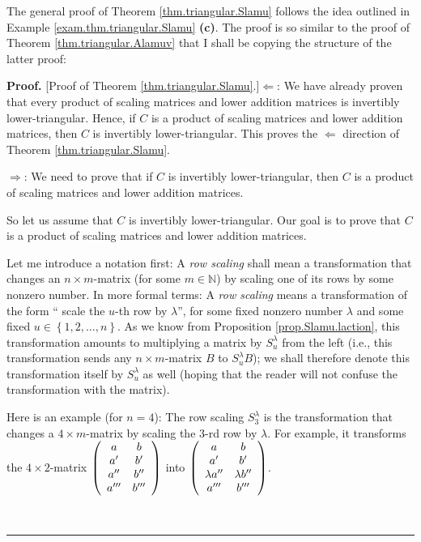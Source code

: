 \documentclass[numbers=enddot,12pt,final,onecolumn,notitlepage]{scrartcl}%
\theoremstyle{definition}
\newenvironment{proof}[1][Proof]{\noindent\textbf{#1.} }{\ \rule{0.5em}{0.5em}}
\begin{document}
The general proof of Theorem \ref{thm.triangular.Slamu} follows the idea
outlined in Example \ref{exam.thm.triangular.Slamu} \textbf{(c)}. The proof is
so similar to the proof of Theorem \ref{thm.triangular.Alamuv} that I shall be
copying the structure of the latter proof:

\begin{proof}
[Proof of Theorem \ref{thm.triangular.Slamu}.]$\Longleftarrow$: We have
already proven that every product of scaling matrices and lower addition
matrices is invertibly lower-triangular. Hence, if $C$ is a product of scaling
matrices and lower addition matrices, then $C$ is invertibly lower-triangular.
This proves the $\Longleftarrow$ direction of Theorem
\ref{thm.triangular.Slamu}.

$\Longrightarrow$: We need to prove that if $C$ is invertibly
lower-triangular, then $C$ is a product of scaling matrices and lower addition matrices.

So let us assume that $C$ is invertibly lower-triangular. Our goal is to prove
that $C$ is a product of scaling matrices and lower addition matrices.

Let me introduce a notation first: A \textit{row scaling} shall mean a
transformation that changes an $n\times m$-matrix (for some $m\in\mathbb{N}$)
by scaling one of its rows by some nonzero number. In more formal terms: A
\textit{row scaling} means a transformation of the form \textquotedblleft
scale the $u$-th row by $\lambda$\textquotedblright, for some fixed nonzero
number $\lambda$ and some fixed $u\in\left\{  1,2,\ldots,n\right\}  $. As we
know from Proposition \ref{prop.Slamu.laction}, this transformation amounts to
multiplying a matrix by $S_{u}^{\lambda}$ from the left (i.e., this
transformation sends any $n\times m$-matrix $B$ to $S_{u}^{\lambda}B$); we
shall therefore denote this transformation itself by $S_{u}^{\lambda}$ as well
(hoping that the reader will not confuse the transformation with the matrix).

Here is an example (for $n=4$): The row scaling $S_{3}^{\lambda}$ is the
transformation that changes a $4\times m$-matrix by scaling the $3$-rd row by
$\lambda$. For example, it transforms the $4\times2$-matrix $\left(
\begin{array}
[c]{cc}%
a & b\\
a^{\prime} & b^{\prime}\\
a^{\prime\prime} & b^{\prime\prime}\\
a^{\prime\prime\prime} & b^{\prime\prime\prime}%
\end{array}
\right)  $ into $\left(
\begin{array}
[c]{cc}%
a & b\\
a^{\prime} & b^{\prime}\\
\lambda a^{\prime\prime} & \lambda b^{\prime\prime}\\
a^{\prime\prime\prime} & b^{\prime\prime\prime}%
\end{array}
\right)  $.


\end{proof}
\end{document}
